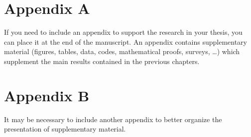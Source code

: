 \documentclass{Configuration_Files/PoliMi3i_thesis}
\let\cleardoublepage\clearpage
\begin{document}















\cleardoublepage
{} %
\appendix

\chapter{Appendix A}
If you need to include an appendix to support the research in your thesis, you can place it at the end of the manuscript.
An appendix contains supplementary material (figures, tables, data, codes, mathematical proofs, surveys, \dots)
which supplement the main results contained in the previous chapters.

\chapter{Appendix B}
It may be necessary to include another appendix to better organize the presentation of supplementary material.


\listoffigures

\listoftables

\end{document}
